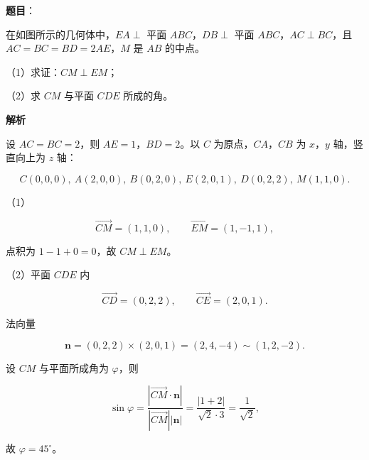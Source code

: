 \begin{answer}

\textbf{题目}：

在如图所示的几何体中，$EA\perp$ 平面 $ABC$，$DB\perp$ 平面 $ABC$，$AC\perp BC$，且 $AC=BC=BD=2AE$，$M$ 是 $AB$ 的中点。

（1）求证：$CM\perp EM$；

（2）求 $CM$ 与平面 $CDE$ 所成的角。
\nopagebreak[4]
\begin{center}\end{center}
\nopagebreak[4]
\textbf{解析}

设 $AC=BC=2$，则 $AE=1$，$BD=2$。以 $C$ 为原点，$CA$，$CB$ 为 $x$，$y$ 轴，竖直向上为 $z$ 轴：

\nopagebreak[4]
\[C(0,0,0),\ A(2,0,0),\ B(0,2,0),\ E(2,0,1),\ D(0,2,2),\ M(1,1,0).\]

（1）

\nopagebreak[4]
\[\overrightarrow{CM}=(1,1,0),\qquad \overrightarrow{EM}=(1,-1,1),\]

点积为 $1-1+0=0$，故 $CM\perp EM$。

（2）平面 $CDE$ 内

\nopagebreak[4]
\[\overrightarrow{CD}=(0,2,2),\qquad \overrightarrow{CE}=(2,0,1).\]

法向量

\nopagebreak[4]
\[\boldsymbol n=(0,2,2)\times(2,0,1)=(2,4,-4)\sim(1,2,-2).\]

设 $CM$ 与平面所成角为 $\varphi$，则

\nopagebreak[4]
\[\sin\varphi=\frac{|\overrightarrow{CM}\cdot\boldsymbol n|}{|\overrightarrow{CM}||\boldsymbol n|}
=\frac{|1+2|}{\sqrt2\cdot3}=\frac1{\sqrt2},\]

故 $\varphi=45^\circ$。


\end{answer}
